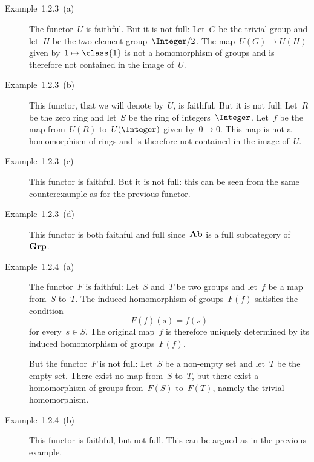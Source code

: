 \subsection{}



\subsubsection{}

\begin{description}
	
	\item[Example~1.2.3~(a)]
		The functor~$U$ is faithful.
		But it is not full:
		Let~$G$ be the trivial group and let~$H$ be the two-element group~$\Integer / 2$.
		The map~$U(G) \to U(H)$ given by~$1 \mapsto \class{1}$ is not a homomorphism of groups and is therefore not contained in the image of~$U$.

	\item[Example~1.2.3~(b)]
		This functor, that we will denote by~$U$, is faithful.
		But it is not full:
		Let~$R$ be the zero ring and let~$S$ be the ring of integers~$\Integer$.
		Let~$f$ be the map from~$U(R)$ to~$U(\Integer)$ given by~$0 \mapsto 0$.
		This map is not a homomorphism of rings and is therefore not contained in the image of~$U$.

	\item[Example~1.2.3~(c)]
		This functor is faithful.
		But it is not full:
		this can be seen from the same counterexample as for the previous functor.

	\item[Example~1.2.3~(d)]
		This functor is both faithful and full since~$\mathbf{Ab}$ is a full subcategory of~$\mathbf{Grp}$.

	\item[Example~1.2.4~(a)]
		The functor~$F$ is faithful:
		Let~$S$ and~$T$ be two groups and let~$f$ be a map from~$S$ to~$T$.
		The induced homomorphism of groups~$F(f)$ satisfies the condition
		\[
			F(f)(s)
			=
			f(s)
		\]
		for every~$s ∈ S$.
		The original map~$f$ is therefore uniquely determined by its induced homomorphism of groups~$F(f)$.

		But the functor~$F$ is not full:
		Let~$S$ be a non-empty set and let~$T$ be the empty set.
		There exist no map from~$S$ to~$T$, but there exist a homomorphism of groups from~$F(S)$ to~$F(T)$, namely the trivial homomorphism.

	\item[Example~1.2.4~(b)]
		This functor is faithful, but not full.
		This can be argued as in the previous example.


\end{description}
